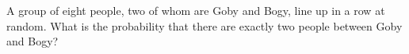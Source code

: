 A group of eight people, two of whom are Goby and Bogy, line up in a row at random. What is the probability that there are exactly two people between Goby and Bogy?
